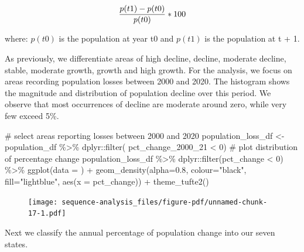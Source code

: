 \documentclass[
  letterpaper,
  DIV=11,
  numbers=noendperiod]{scrreprt}
\newenvironment{Shaded}{\begin{snugshade}}{\end{snugshade}}
\newcommand{\AttributeTok}[1]{\textcolor[rgb]{0.40,0.45,0.13}{#1}}
\newcommand{\CommentTok}[1]{\textcolor[rgb]{0.37,0.37,0.37}{#1}}
\newcommand{\DecValTok}[1]{\textcolor[rgb]{0.68,0.00,0.00}{#1}}
\newcommand{\FloatTok}[1]{\textcolor[rgb]{0.68,0.00,0.00}{#1}}
\newcommand{\FunctionTok}[1]{\textcolor[rgb]{0.28,0.35,0.67}{#1}}
\newcommand{\NormalTok}[1]{\textcolor[rgb]{0.00,0.23,0.31}{#1}}
\newcommand{\OtherTok}[1]{\textcolor[rgb]{0.00,0.23,0.31}{#1}}
\newcommand{\SpecialCharTok}[1]{\textcolor[rgb]{0.37,0.37,0.37}{#1}}
\newcommand{\StringTok}[1]{\textcolor[rgb]{0.13,0.47,0.30}{#1}}
\begin{document}
\[
{p(t1) - p(t0) \over p(t0)}*100
\]

where: \(p(t0)\) is the population at year t0 and \(p(t1)\) is the
population at t + 1.

As previously, we differentiate areas of high decline, decline, moderate
decline, stable, moderate growth, growth and high growth. For the
analysis, we focus on areas recording population losses between 2000 and
2020. The histogram shows the magnitude and distribution of population
decline over this period. We observe that most occurrences of decline
are moderate around zero, while very few exceed 5\%.

\begin{Shaded}
\begin{Highlighting}[]
\CommentTok{\# select areas reporting losses between 2000 and 2020}
\NormalTok{population\_loss\_df }\OtherTok{\textless{}{-}}\NormalTok{ population\_df }\SpecialCharTok{\%\textgreater{}\%} 
\NormalTok{  dplyr}\SpecialCharTok{::}\FunctionTok{filter}\NormalTok{( pct\_change\_2000\_21 }\SpecialCharTok{\textless{}} \DecValTok{0}\NormalTok{)}
\CommentTok{\# plot distribution of percentage change }
\NormalTok{population\_loss\_df }\SpecialCharTok{\%\textgreater{}\%} 
\NormalTok{  dplyr}\SpecialCharTok{::}\FunctionTok{filter}\NormalTok{(pct\_change  }\SpecialCharTok{\textless{}} \DecValTok{0}\NormalTok{) }\SpecialCharTok{\%\textgreater{}\%} 
  \FunctionTok{ggplot}\NormalTok{(}\AttributeTok{data =}\NormalTok{  ) }\SpecialCharTok{+}
  \FunctionTok{geom\_density}\NormalTok{(}\AttributeTok{alpha=}\FloatTok{0.8}\NormalTok{, }\AttributeTok{colour=}\StringTok{"black"}\NormalTok{, }\AttributeTok{fill=}\StringTok{"lightblue"}\NormalTok{, }\FunctionTok{aes}\NormalTok{(}\AttributeTok{x =}\NormalTok{ pct\_change)) }\SpecialCharTok{+}
  \FunctionTok{theme\_tufte2}\NormalTok{()}
\end{Highlighting}
\end{Shaded}

\begin{figure}[H]

{\centering \texttt{[image: sequence-analysis\_files/figure-pdf/unnamed-chunk-17-1.pdf]}

}

\end{figure}

Next we classify the annual percentage of population change into our
seven states.
\end{document}
